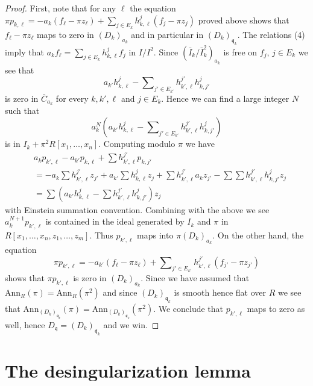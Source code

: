 \begin{proof}
\medskip\noindent
First, note that for any $\ell$ the equation
$\pi p_{k, \ell} = -a_k(f_\ell - \pi z_\ell) +
\sum_{j \in E_k} h_{k, \ell}^j (f_j - \pi z_j)$ proved above shows that
$f_\ell - \pi z_\ell$ maps to zero in $(D_k)_{a_k}$ and in particular
in $(D_k)_{\mathfrak q_k}$.
The relations (4) imply that $a_k f_\ell =
\sum_{j \in E_k} h_{k, \ell}^j f_j$ in $I/I^2$.
Since $(\bar I_k/\bar I_k^2)_{a_k}$ is free on $f_j$, $j \in E_k$
we see that
$$
a_{k'} h_{k, \ell}^j -
\sum\nolimits_{j' \in E_{k'}} h_{k', \ell}^{j'} h_{k, j'}^j
$$
is zero in $\bar C_{a_k}$ for every $k, k', \ell$ and $j \in E_k$.
Hence we can find a large integer $N$ such that
$$
a_k^N\left(
a_{k'} h_{k, \ell}^j -
\sum\nolimits_{j' \in E_{k'}} h_{k', \ell}^{j'} h_{k, j'}^j
\right)
$$
is in $I_k + \pi^2R[x_1, \ldots, x_n]$. Computing modulo $\pi$ we have
\begin{align*}
&
a_kp_{k', \ell} - a_{k'}p_{k, \ell} + \sum h_{k', \ell}^{j'} p_{k, j'}
\\
&
=
- a_k \sum h_{k', \ell}^{j'} z_{j'}
+ a_{k'} \sum h_{k, \ell}^j z_j
+ \sum h_{k', \ell}^{j'} a_k z_{j'}
- \sum \sum h_{k', \ell}^{j'} h_{k, j'}^j z_j \\
&
=
\sum \left(
a_{k'} h_{k, \ell}^j
- \sum h_{k', \ell}^{j'} h_{k, j'}^j
\right) z_j
\end{align*}
with Einstein summation convention. Combining with the above we see
$a_k^{N + 1} p_{k', \ell}$ is contained in the ideal generated
by $I_k$ and $\pi$ in $R[x_1, \ldots, x_n, z_1, \ldots, z_m]$.
Thus $p_{k', \ell}$ maps into $\pi (D_k)_{a_k}$. On the other hand,
the equation
$$
\pi p_{k', \ell} =
-a_{k'} (f_\ell - \pi z_\ell) +
\sum\nolimits_{j' \in E_{k'}} h_{k', \ell}^{j'}(f_{j'} - \pi z_{j'})
$$
shows that $\pi p_{k', \ell}$ is zero in $(D_k)_{a_k}$.
Since we have assumed that $\text{Ann}_R(\pi) = \text{Ann}_R(\pi^2)$
and since $(D_k)_{\mathfrak q_k}$ is smooth hence flat over $R$
we see that
$\text{Ann}_{(D_k)_{\mathfrak q_k}}(\pi) =
\text{Ann}_{(D_k)_{\mathfrak q_k}}(\pi^2)$.
We conclude that $p_{k', \ell}$ maps to zero as well, hence
$D_{\mathfrak q} = (D_k)_{\mathfrak q_k}$ and we win.
\end{proof}






\section{The desingularization lemma}
\label{section-desingularization-lemma}

